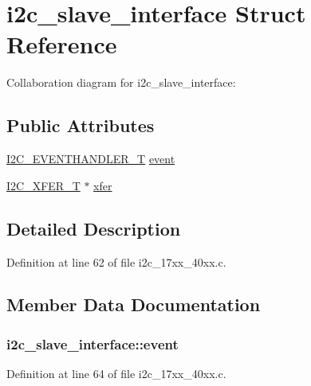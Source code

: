 \hypertarget{structi2c__slave__interface}{}\section{i2c\+\_\+slave\+\_\+interface Struct Reference}
\label{structi2c__slave__interface}


Collaboration diagram for i2c\+\_\+slave\+\_\+interface\+:
\subsection*{Public Attributes}
\begin{DoxyCompactItemize}
\item 
\hyperlink{group__I2C__17XX__40XX_gaef152f4dc1487d90573810007489082e}{I2\+C\+\_\+\+E\+V\+E\+N\+T\+H\+A\+N\+D\+L\+E\+R\+\_\+T} \hyperlink{structi2c__slave__interface_a4b04024cbfed90df358b3546c1e9a2e0}{event}
\item 
\hyperlink{structI2C__XFER__T}{I2\+C\+\_\+\+X\+F\+E\+R\+\_\+T} $\ast$ \hyperlink{structi2c__slave__interface_a934caaab567fddcae9ebec6358047275}{xfer}
\end{DoxyCompactItemize}


\subsection{Detailed Description}


Definition at line 62 of file i2c\+\_\+17xx\+\_\+40xx.\+c.



\subsection{Member Data Documentation}
\subsubsection[{\texorpdfstring{event}{event}}]{ i2c\+\_\+slave\+\_\+interface\+::event}\hypertarget{structi2c__slave__interface_a4b04024cbfed90df358b3546c1e9a2e0}{}\label{structi2c__slave__interface_a4b04024cbfed90df358b3546c1e9a2e0}


Definition at line 64 of file i2c\+\_\+17xx\+\_\+40xx.\+c.


